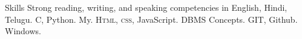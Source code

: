 

\begin{rubric}{Skills}
\entry*[Languages]
	Strong reading, writing, and speaking competencies in English, Hindi, Telugu.
	C, Python.
\entry*[Databases]
	My.
	\textsc{Html, css}, JavaScript.
	DBMS Concepts.
	GIT, Github.
	Windows.

\end{rubric}
